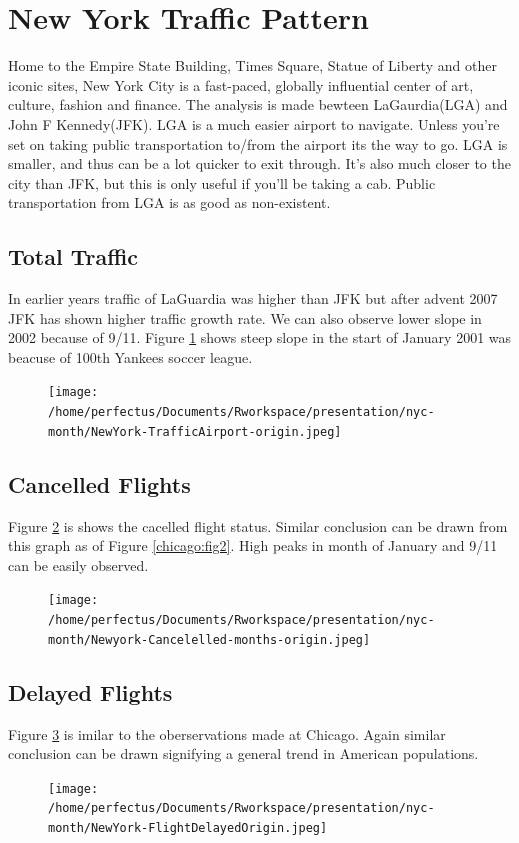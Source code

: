 \section{New York Traffic Pattern}
Home to the Empire State Building, Times Square, Statue of Liberty and other iconic sites, New York City is a fast-paced, globally influential center of art, culture, fashion and finance. The analysis is made bewteen LaGaurdia(LGA) and John F Kennedy(JFK).  LGA is a much easier airport to navigate. Unless you're set on taking public transportation to/from the airport its the way to go. LGA is smaller, and thus can be a lot quicker to exit through. It's also much closer to the city than JFK, but this is only useful if you'll be taking a cab. Public transportation from LGA is as good as non-existent.

\subsection{Total Traffic}
In earlier years traffic of LaGuardia was higher than JFK but after advent 2007 JFK has shown higher traffic growth rate. We can also observe lower slope in 2002 because of 9/11. Figure \ref{nyc:fig1} shows steep slope in the start of January 2001 was beacuse of 100th Yankees soccer league.
\begin{figure}[htp]
\centering
\texttt{[image: /home/perfectus/Documents/Rworkspace/presentation/nyc-month/NewYork-TrafficAirport-origin.jpeg]}
\caption{}
\label{nyc:fig1}
\end{figure}

\subsection{Cancelled Flights}
Figure \ref{nyc:fig2} is shows the cacelled flight status. Similar conclusion can be drawn from this graph as of Figure \ref{chicago:fig2}. High peaks in month of January and 9/11 can be easily observed. 

\begin{figure}[htp]
\centering
\texttt{[image: /home/perfectus/Documents/Rworkspace/presentation/nyc-month/Newyork-Cancelelled-months-origin.jpeg]}
\caption{}
\label{nyc:fig2}
\end{figure}
\subsection{Delayed Flights}
Figure \ref{nyc:fig3} is imilar to the oberservations made at Chicago. Again similar conclusion can be drawn signifying a general trend in American populations.
\begin{figure}[htp]
\centering
\texttt{[image: /home/perfectus/Documents/Rworkspace/presentation/nyc-month/NewYork-FlightDelayedOrigin.jpeg]}
\caption{}
\label{nyc:fig3}
\end{figure}

